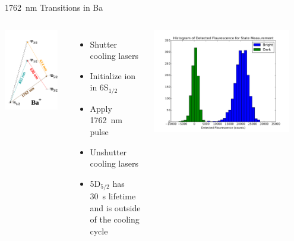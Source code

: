 \documentclass{beamer}
\begin{document}
\begin{frame}{1762~nm Transitions in Ba}
\begin{columns}[c]
	\includegraphics[width=0.9\textwidth]{ionized-Ba}
	\begin{itemize}
		\item Shutter cooling lasers
		\item Initialize ion in 6S$_{1/2}$
		\item Apply 1762~nm pulse
		\item Unshutter cooling lasers
		\item 5D$_{5/2}$  has 30~s lifetime and is outside of the cooling cycle
	\end{itemize}
	\includegraphics[width=0.9\textwidth]{StateMeasurement}

\end{columns}
\end{frame}
\end{document}
